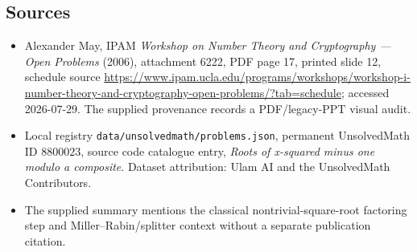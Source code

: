 \documentclass[11pt]{article}
\begin{document}
\subsection{Sources}
\begin{itemize}
\item Alexander May, IPAM \emph{Workshop on Number Theory and Cryptography --- Open Problems} (2006), attachment 6222, PDF page 17, printed slide 12, schedule source \url{https://www.ipam.ucla.edu/programs/workshops/workshop-i-number-theory-and-cryptography-open-problems/?tab=schedule}; accessed 2026-07-29. The supplied provenance records a PDF/legacy-PPT visual audit.
\item Local registry \texttt{data/unsolvedmath/problems.json}, permanent UnsolvedMath ID $8800023$, source code catalogue entry, \emph{Roots of x-squared minus one modulo a composite}. Dataset attribution: Ulam AI and the UnsolvedMath Contributors.
\item The supplied summary mentions the classical nontrivial-square-root factoring step and Miller--Rabin/splitter context without a separate publication citation.
\end{itemize}
\end{document}
